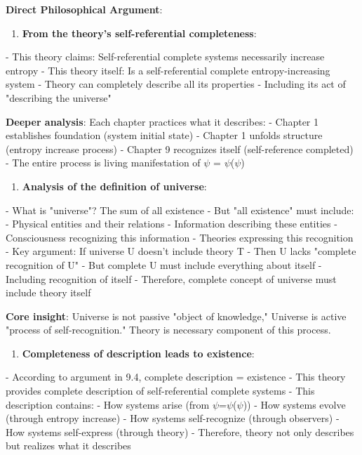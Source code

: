 \textbf{Direct Philosophical Argument}:

\begin{enumerate}
\item \textbf{From the theory's self-referential completeness}:
\end{enumerate}
   - This theory claims: Self-referential complete systems necessarily increase entropy
   - This theory itself: Is a self-referential complete entropy-increasing system
   - Theory can completely describe all its properties
   - Including its act of "describing the universe"
   
   \textbf{Deeper analysis}: Each chapter practices what it describes:
   - Chapter 1 establishes foundation (system initial state)
   - Chapter 1 unfolds structure (entropy increase process)
   - Chapter 9 recognizes itself (self-reference completed)
   - The entire process is living manifestation of $\psi$ = $\psi$($\psi$)

\begin{enumerate}
\item \textbf{Analysis of the definition of universe}:
\end{enumerate}
   - What is "universe"? The sum of all existence
   - But "all existence" must include:
     - Physical entities and their relations
     - Information describing these entities
     - Consciousness recognizing this information
     - Theories expressing this recognition
   - Key argument: If universe U doesn't include theory T
     - Then U lacks "complete recognition of U"
     - But complete U must include everything about itself
     - Including recognition of itself
   - Therefore, complete concept of universe must include theory itself
   
   \textbf{Core insight}: Universe is not passive "object of knowledge,"
   Universe is active "process of self-recognition."
   Theory is necessary component of this process.

\begin{enumerate}
\item \textbf{Completeness of description leads to existence}:
\end{enumerate}
   - According to argument in 9.4, complete description = existence
   - This theory provides complete description of self-referential complete systems
   - This description contains:
     - How systems arise (from $\psi$=$\psi$($\psi$))
     - How systems evolve (through entropy increase)
     - How systems self-recognize (through observers)
     - How systems self-express (through theory)
   - Therefore, theory not only describes but realizes what it describes
   
